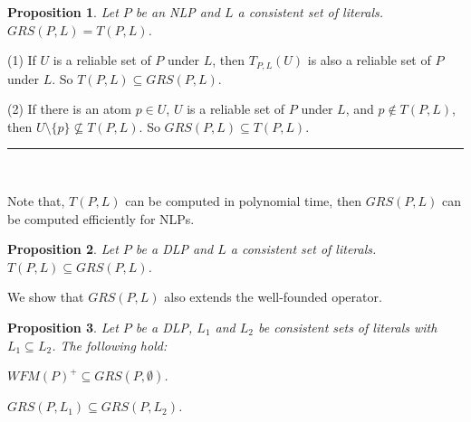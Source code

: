 \documentclass{article}
\newenvironment{tight_itemize}{
\begin{itemize}
   \setlength{\itemsep}{0pt}%
  \setlength{\topsep}{0pt}%
  \setlength{\partopsep}{0pt}%
  \setlength{\parskip}{0pt}%
  \setlength{\parsep}{0pt}%
}{\end{itemize}}
\newtheorem{proposition}{Proposition}
\newenvironment{proofs}{{\bf Proof Sketch:}}{\rule{2mm}{2mm}\\[-.5em] }
\newcommand{\WFM}{W\!F\!M}
\newcommand{\GRS}{G\!R\!S}
\newcommand{\GSRS}{G\!S\!R\!S}
\begin{document}


\begin{proposition}\label{prop:last}
  Let $P$ be an NLP and $L$ a consistent set of literals. $\GRS(P, L) = T(P, L)$.
\end{proposition}
\begin{proofs}
  (1) If $U$ is a reliable set of $P$ under $L$, then $T_{P, L}(U)$ is also a reliable set of $P$ under $L$. So $T(P, L)\subseteq \GRS(P, L)$.

  (2) If there is an atom $p\in U$, $U$ is a  reliable set of $P$ under $L$, and $p\notin T(P, L)$, then $U\setminus \{p\} \not\subseteq T(P, L)$. So $\GRS(P, L) \subseteq T(P, L)$.
%
\end{proofs}

Note that, $T(P, L)$ can be computed in polynomial time, then $\GRS(P, L)$ can be computed efficiently for NLPs.

\begin{proposition}\label{prop:last1}
  Let $P$ be a DLP and $L$ a consistent set of literals. $T(P, L) \subseteq \GRS(P, L)$.
\end{proposition}

We show that $\GRS(P, L)$ also extends the well-founded operator.
\begin{proposition}
  Let $P$ be a DLP, $L_1$ and $L_2$ be consistent sets of literals with $L_1 \subseteq L_2$. The following hold:
  \begin{tight_itemize}
  \item $\WFM(P)^+ \subseteq \GRS(P, \emptyset)$.
  \item $\GRS(P, L_1) \subseteq \GRS(P, L_2)$.
  \end{tight_itemize}
\end{proposition}
\end{document}
